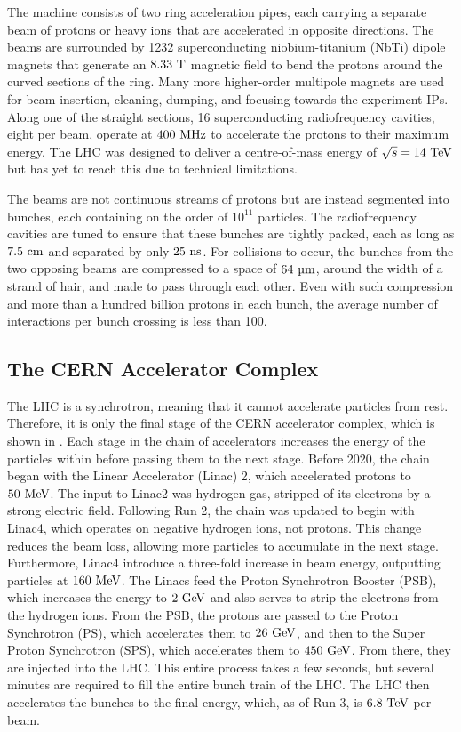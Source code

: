 The machine consists of two ring acceleration pipes, each carrying a separate beam of protons or heavy ions that are accelerated in opposite directions.
The beams are surrounded by 1232 superconducting niobium-titanium (NbTi) dipole magnets that generate an $8.33~\tesla$ magnetic field to bend the protons around the curved sections of the ring.
Many more higher-order multipole magnets are used for beam insertion, cleaning, dumping, and focusing towards the experiment IPs.
Along one of the straight sections, 16 superconducting radiofrequency cavities, eight per beam, operate at $400~\MHz$ to accelerate the protons to their maximum energy.
The LHC was designed to deliver a centre-of-mass energy of $\sqrt{s}=14~\TeV$ but has yet to reach this due to technical limitations.

The beams are not continuous streams of protons but are instead segmented into bunches, each containing on the order of $10^{11}$ particles.
The radiofrequency cavities are tuned to ensure that these bunches are tightly packed, each as long as $7.5~\cm$ and separated by only $25~\ns$.
For collisions to occur, the bunches from the two opposing beams are compressed to a space of $64~\um$, around the width of a strand of hair, and made to pass through each other.
Even with such compression and more than a hundred billion protons in each bunch, the average number of interactions per bunch crossing \avemu is less than 100.

\subsection{The CERN Accelerator Complex}

The LHC is a synchrotron, meaning that it cannot accelerate particles from rest.
Therefore, it is only the final stage of the CERN accelerator complex, which is shown in .
Each stage in the chain of accelerators increases the energy of the particles within before passing them to the next stage.
Before 2020, the chain began with the Linear Accelerator (Linac) 2, which accelerated protons to $50~\MeV$.
The input to Linac2 was hydrogen gas, stripped of its electrons by a strong electric field.
Following Run 2, the chain was updated to begin with Linac4, which operates on negative hydrogen ions, not protons.
This change reduces the beam loss, allowing more particles to accumulate in the next stage.
Furthermore, Linac4 introduce a three-fold increase in beam energy, outputting particles at $160~\MeV$.
The Linacs feed the Proton Synchrotron Booster (PSB), which increases the energy to $2~\GeV$ and also serves to strip the electrons from the hydrogen ions.
From the PSB, the protons are passed to the Proton Synchrotron (PS), which accelerates them to $26~\GeV$, and then to the Super Proton Synchrotron (SPS), which accelerates them to $450~\GeV$.
From there, they are injected into the LHC.
This entire process takes a few seconds, but several minutes are required to fill the entire bunch train of the LHC.
The LHC then accelerates the bunches to the final energy, which, as of Run 3, is $6.8~\TeV$ per beam.

